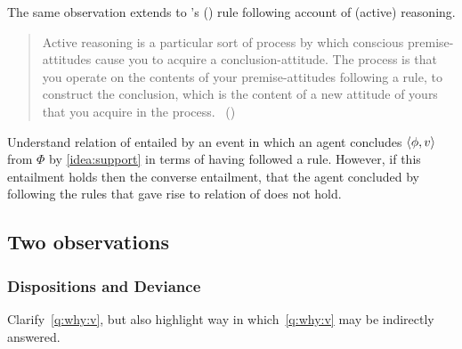 \begin{note}
  The same observation extends to \citeauthor{Broome:2002aa}'s (\citeyear{Broome:2013aa}) rule following account of (active) reasoning.

  \begin{quote}
    Active reasoning is a particular sort of process by which conscious premise-attitudes cause you to acquire a conclusion-attitude.
    The process is that you operate on the contents of your premise-attitudes following a rule, to construct the conclusion, which is the content of a new attitude of yours that you acquire in the process.\newline
    \mbox{ }\hfill\mbox{(\citeyear[234]{Broome:2002aa})}
  \end{quote}

  Understand relation of \support{} entailed by an event in which an agent concludes \(\langle \phi, v \rangle\) from \(\Phi\) by \autoref{idea:support} in terms of having followed a rule.
  However, if this entailment holds then the converse entailment, that the agent concluded by following the rules that gave rise to relation of \support{} does not hold.
\end{note}

\subsection{Two observations}
\label{sec:two-observations}

\subsubsection{Dispositions and Deviance}
\label{cha:clarification:sec:dis-and-dev}

\begin{note}
  Clarify~\autoref{q:why:v}, but also highlight way in which~\autoref{q:why:v} may be indirectly answered.
\end{note}

